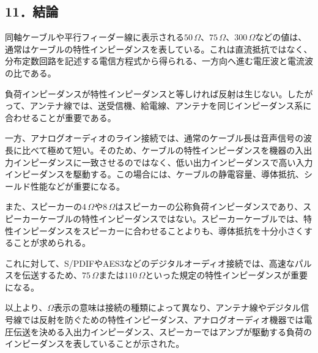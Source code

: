 \documentclass[platex,dvipdfmx,a4paper]{jsarticle}
\begin{document}
\subsection*{11．結論}

同軸ケーブルや平行フィーダー線に表示される$50\,\Omega$、$75\,\Omega$、$300\,\Omega$などの値は、通常はケーブルの特性インピーダンスを表している。これは直流抵抗ではなく、分布定数回路を記述する電信方程式から得られる、一方向へ進む電圧波と電流波の比である。

負荷インピーダンスが特性インピーダンスと等しければ反射は生じない。したがって、アンテナ線では、送受信機、給電線、アンテナを同じインピーダンス系に合わせることが重要である。

一方、アナログオーディオのライン接続では、通常のケーブル長は音声信号の波長に比べて極めて短い。そのため、ケーブルの特性インピーダンスを機器の入出力インピーダンスに一致させるのではなく、低い出力インピーダンスで高い入力インピーダンスを駆動する。この場合には、ケーブルの静電容量、導体抵抗、シールド性能などが重要になる。

また、スピーカーの$4\,\Omega$や$8\,\Omega$はスピーカーの公称負荷インピーダンスであり、スピーカーケーブルの特性インピーダンスではない。スピーカーケーブルでは、特性インピーダンスをスピーカーに合わせることよりも、導体抵抗を十分小さくすることが求められる。

これに対して、S/PDIFやAES3などのデジタルオーディオ接続では、高速なパルスを伝送するため、$75\,\Omega$または$110\,\Omega$といった規定の特性インピーダンスが重要になる。

以上より、$\Omega$表示の意味は接続の種類によって異なり、アンテナ線やデジタル信号線では反射を防ぐための特性インピーダンス、アナログオーディオ機器では電圧伝送を決める入出力インピーダンス、スピーカーではアンプが駆動する負荷のインピーダンスを表していることが示された。
\end{document}
